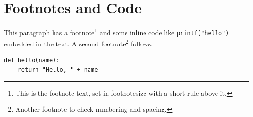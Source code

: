 \documentclass[acmsmall,nonacm]{acmart}
\begin{document}
\thispagestyle{empty}%
\section{Footnotes and Code}
This paragraph has a footnote\footnote{This is the footnote text, set in footnotesize with a short rule above it.} and some inline code like \texttt{printf("hello")} embedded in the text. A second footnote\footnote{Another footnote to check numbering and spacing.} follows.

\begin{verbatim}
def hello(name):
    return "Hello, " + name
\end{verbatim}
\end{document}
